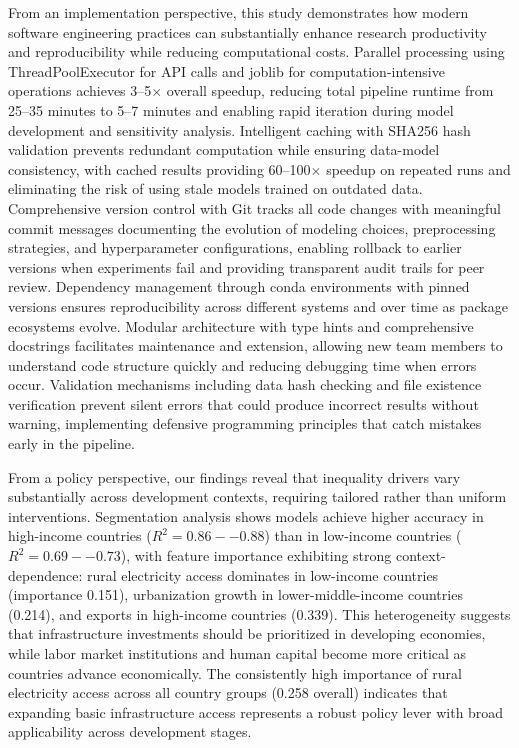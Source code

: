 \documentclass[10pt,twocolumn]{article}
\begin{document}
\par From an implementation perspective, this study demonstrates how modern software engineering practices can substantially enhance research productivity and reproducibility while reducing computational costs. Parallel processing using ThreadPoolExecutor for API calls and joblib for computation-intensive operations achieves 3--5$\times$ overall speedup, reducing total pipeline runtime from 25--35 minutes to 5--7 minutes and enabling rapid iteration during model development and sensitivity analysis. Intelligent caching with SHA256 hash validation prevents redundant computation while ensuring data-model consistency, with cached results providing 60--100$\times$ speedup on repeated runs and eliminating the risk of using stale models trained on outdated data. Comprehensive version control with Git tracks all code changes with meaningful commit messages documenting the evolution of modeling choices, preprocessing strategies, and hyperparameter configurations, enabling rollback to earlier versions when experiments fail and providing transparent audit trails for peer review. Dependency management through conda environments with pinned versions ensures reproducibility across different systems and over time as package ecosystems evolve. Modular architecture with type hints and comprehensive docstrings facilitates maintenance and extension, allowing new team members to understand code structure quickly and reducing debugging time when errors occur. Validation mechanisms including data hash checking and file existence verification prevent silent errors that could produce incorrect results without warning, implementing defensive programming principles that catch mistakes early in the pipeline.
\par From a policy perspective, our findings reveal that inequality drivers vary substantially across development contexts, requiring tailored rather than uniform interventions. Segmentation analysis shows models achieve higher accuracy in high-income countries ($R^2 = 0.86--0.88$) than in low-income countries ($R^2 = 0.69--0.73$), with feature importance exhibiting strong context-dependence: rural electricity access dominates in low-income countries (importance 0.151), urbanization growth in lower-middle-income countries (0.214), and exports in high-income countries (0.339). This heterogeneity suggests that infrastructure investments should be prioritized in developing economies, while labor market institutions and human capital become more critical as countries advance economically. The consistently high importance of rural electricity access across all country groups (0.258 overall) indicates that expanding basic infrastructure access represents a robust policy lever with broad applicability across development stages. 
\end{document}
